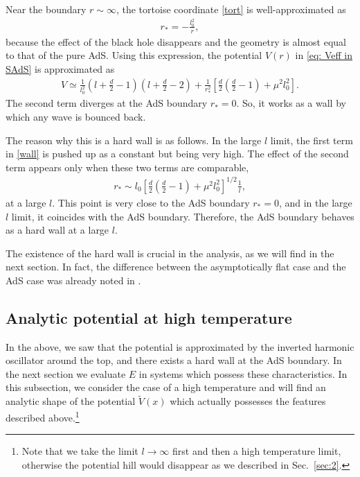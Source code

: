 \documentclass[a4paper,11pt]{article}
\begin{document}
Near the boundary $r \sim \infty$, the tortoise coordinate \eqref{tort} is well-approximated as
\begin{align}
    r_* = -\frac{l_0^2}{r} ,
    \label{tort1}
\end{align}
because the effect of the black hole disappears and the geometry is almost equal to that of the pure AdS.
Using this expression, the potential $V(r)$ in \eqref{eq: Veff in SAdS} is approximated as
\begin{align}
    V \simeq
    \frac{1}{l_0^2}
    \left(l+\frac{d}{2}-1\right)
 \left(l+\frac{d}{2}-2\right)
 + \frac{1}{r_*^2}
     \left[\frac{d}{2}\left(\frac{d}{2}-1\right)+\mu^2l_0^2 \right].
     \label{wall}
\end{align}
The second term diverges at the AdS boundary $r_*=0$. So, it works as a wall by which any wave is bounced back.

The reason why this is a hard wall is as follows. In the large $l$ limit, the first term in \eqref{wall} is pushed up as a constant but being very high. The effect of the second term appears only when these two terms are comparable, 
\begin{align}
    r_* \sim l_0 
    \left[\frac{d}{2}\left(\frac{d}{2}-1\right)+\mu^2l_0^2 \right]^{1/2} \frac{1}{l},
\end{align}
at a large $l$. This point is very close to the AdS boundary $r_*=0$, and in the large $l$ limit, it coincides with the AdS boundary. Therefore, the AdS boundary behaves as a hard wall at a large $l$.

The existence of the hard wall is crucial in the analysis, as we will find in the next section. In fact, the difference between the asymptotically flat case and the AdS case was already noted in \cite{Cardoso:2008bp}.




\subsection{Analytic potential at high temperature}

In the above, we saw that the potential is approximated by the inverted harmonic oscillator around the top, and there exists a hard wall at the AdS boundary. In the next section we evaluate $E$ in systems which possess these characteristics.
In this subsection, we consider the case of a high temperature and will find an analytic shape of the potential $\widetilde{V}(x)$ which actually possesses the features described above.\footnote{Note that we take the limit $l\to\infty$ first and then a high temperature limit, otherwise the potential hill would disappear as we described in Sec.~\ref{sec:2}.}
\end{document}
